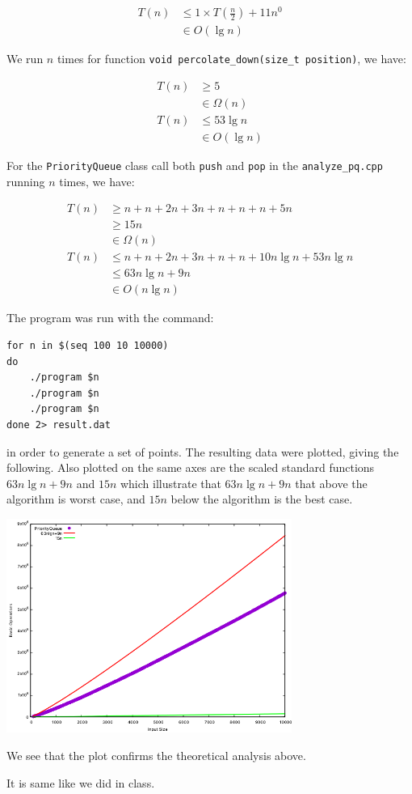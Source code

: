 \documentclass[11pt]{article}
\begin{document}
\begin{align*}
    T(n) & \leq 1 \times T(\frac{n}{2}) + 11n^0 \\
         & \in O(\lg n) 
\end{align*}

We run $n$ times for function \texttt{void percolate\_down(size\_t position)}, we have:

\begin{align*}
    T(n) &\geq 5 \\
         &\in \Omega(n) \\
    T(n) & \leq 53\lg n \\
         & \in O(\lg n) 
\end{align*}

For the \texttt{PriorityQueue} class call both \texttt{push} and \texttt{pop}
in the \texttt{analyze\_pq.cpp} running 
$n$ times, we have:

\begin{align*}
    T(n) & \geq n + n + 2n + 3n + n + n + n + 5n\\
         & \geq 15n \\
         & \in \Omega(n) \\
    T(n) & \leq n + n + 2n + 3n + n + n + 10n\lg n + 53n\lg n \\
         & \leq 63n\lg n + 9n \\
         & \in O(n\lg n) 
\end{align*}

The program was run with the command:

\begin{Verbatim}
for n in $(seq 100 10 10000)
do
    ./program $n
    ./program $n
    ./program $n
done 2> result.dat
\end{Verbatim}

in order to generate a set of points.  The resulting data were
plotted, giving the following.  Also plotted on the same axes are the
scaled standard functions $63n\lg n + 9n$ and $15n$ which illustrate 
that $63n\lg n + 9n$ that above the algorithm is worst case, and $15n$ below 
the algorithm is the best case.

\begin{center}
  \includegraphics[width=0.7\textwidth]{analysis.png}
\end{center} 
We see that the plot confirms the theoretical analysis above.

It is same like we did in class.
\end{document}

